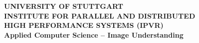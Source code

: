 \setcounter{secnumdepth}{3}
\setcounter{tocdepth}{3}
{\newpage
\clearpage
\samepage \begin{figure}[th]
\begin{center}
\begin{minipage}{\textwidth}
\end{minipage}
\end{center}
\end{figure}
}

{\newpage
\clearpage
\samepage \begin{figure}[ht]
 \begin{center}
  \begin{minipage}{2cm}
  \end{minipage}
  \hfill
  \begin{minipage}{11cm}
   \begin{center}
    {\sf \bf \Large UNIVERSITY OF STUTTGART\\  \vspace*{0.4cm}
    \normalsize INSTITUTE FOR PARALLEL AND DISTRIBUTED\\  HIGH PERFORMANCE
    SYSTEMS (IPVR)\\  \vspace*{0.4cm}
    Applied Computer Science -- Image Understanding}
   \end{center}
  \end{minipage}
  \hfill
  \begin{minipage}{2cm}
  \end{minipage}
 \end{center}
\end{figure}
}

{\newpage
\clearpage
\samepage \begin{figure}[htbp]
\begin{center}
  \begin{minipage}{\textwidth}
  \end{minipage}

\label{SNNS}
\end{center}
\end{figure}
}

